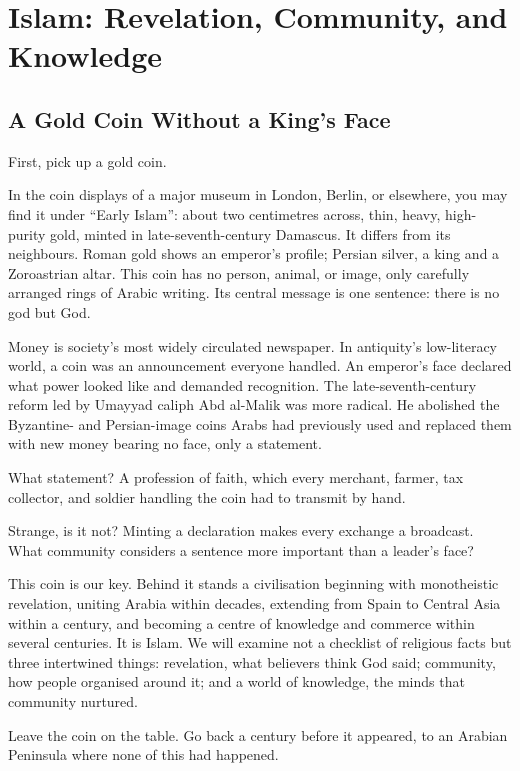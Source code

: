 \chapter[Islam: Faith, Community, Knowledge]{Islam: Revelation, Community, and Knowledge}
\section{A Gold Coin Without a King's Face}
First, pick up a gold coin.

In the coin displays of a major museum in London, Berlin, or elsewhere, you may find it under ``Early Islam'': about two centimetres across, thin, heavy, high-purity gold, minted in late-seventh-century Damascus. It differs from its neighbours. Roman gold shows an emperor's profile; Persian silver, a king and a Zoroastrian altar. This coin has no person, animal, or image, only carefully arranged rings of Arabic writing. Its central message is one sentence: there is no god but God.

Money is society's most widely circulated newspaper. In antiquity's low-literacy world, a coin was an announcement everyone handled. An emperor's face declared what power looked like and demanded recognition. The late-seventh-century reform led by Umayyad caliph Abd al-Malik was more radical. He abolished the Byzantine- and Persian-image coins Arabs had previously used and replaced them with new money bearing no face, only a statement.

What statement? A profession of faith, which every merchant, farmer, tax collector, and soldier handling the coin had to transmit by hand.

Strange, is it not? Minting a declaration makes every exchange a broadcast. What community considers a sentence more important than a leader's face?

This coin is our key. Behind it stands a civilisation beginning with monotheistic revelation, uniting Arabia within decades, extending from Spain to Central Asia within a century, and becoming a centre of knowledge and commerce within several centuries. It is Islam. We will examine not a checklist of religious facts but three intertwined things: revelation, what believers think God said; community, how people organised around it; and a world of knowledge, the minds that community nurtured.

Leave the coin on the table. Go back a century before it appeared, to an Arabian Peninsula where none of this had happened.

